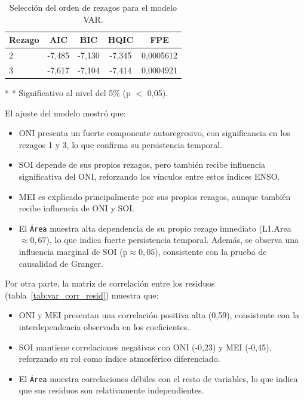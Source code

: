 \begin{table}[H]
    \centering
    \begin{threeparttable}
    \caption{Selección del orden de rezagos para el modelo VAR.}
    \label{tab:var_lags}
    \begin{tabular}{lcccc}
        \toprule
        \textbf{Rezago} & \textbf{AIC} & \textbf{BIC} & \textbf{HQIC} & \textbf{FPE} \\
        \midrule
        2 & -7,485 & -7,130\tnote{*} & -7,345 & 0,0005612 \\
        3 & -7,617\tnote{*} & -7,104 & -7,414\tnote{*} & 0,0004921\tnote{*} \\
        \bottomrule
    \end{tabular}
    \begin{tablenotes}
      \footnotesize
      \item [*] * Significativo al nivel del 5\% (p $<$ 0,05).
    \end{tablenotes}
    \end{threeparttable}
\end{table}


El ajuste del modelo mostró que:

\begin{itemize}
    \item ONI presenta un fuerte componente autoregresivo, con significancia en los rezagos 1 y 3, lo que confirma su persistencia temporal.
    \item SOI depende de sus propios rezagos, pero también recibe influencia significativa del ONI, reforzando los vínculos entre estos índices ENSO.
    \item MEI es explicado principalmente por sus propios rezagos, aunque también recibe influencia de ONI y SOI.
    \item El \texttt{Área} muestra alta dependencia de su propio rezago inmediato (L1.Area $\approx 0,67$), lo que indica fuerte persistencia temporal. Además, se observa una influencia marginal de SOI (p$\approx 0,05$), consistente con la prueba de causalidad de Granger.
\end{itemize}

Por otra parte, la matriz de correlación entre los residuos (tabla~\ref{tab:var_corr_resid}) muestra que:

\begin{itemize}
    \item ONI y MEI presentan una correlación positiva alta (0,59), consistente con la interdependencia observada en los coeficientes.
    \item SOI mantiene correlaciones negativas con ONI (-0,23) y MEI (-0,45), reforzando su rol como índice atmosférico diferenciado.
    \item El \texttt{Área} muestra correlaciones débiles con el resto de variables, lo que indica que sus residuos son relativamente independientes.
\end{itemize}


